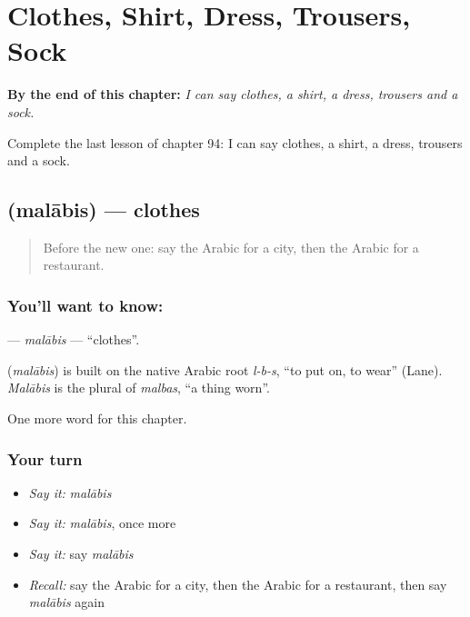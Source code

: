 
\chapter{Clothes, Shirt, Dress, Trousers, Sock}
\label{ch:ar-clothes-shirt-dress-trousers-sock}

\begin{chapteropening}
\textbf{By the end of this chapter:} \emph{I can say clothes, a shirt, a dress, trousers and a sock.}

Complete the last lesson of chapter 94: I can say clothes, a shirt, a dress, trousers and a sock.
\end{chapteropening}

\section[\texorpdfstring{\ar{ملابس} (malābis)}{ملابس (malābis)}]{ (malābis) — clothes}

\label{lesson:AR-C94-malabis}



\begin{quote}
Before the new one: say the Arabic for a city, then the Arabic for a restaurant.
\end{quote}

\subsection*{You'll want to know: }
\textbf{} — \emph{malābis} — \textquotedblleft{}clothes\textquotedblright{}.

\begin{cousinweb}
\textbf{} (\emph{malābis}) is built on the native Arabic root \emph{l-b-s}, \textquotedblleft{}to put on, to wear\textquotedblright{} (Lane). \emph{Malābis} is the plural of \emph{malbas}, \textquotedblleft{}a thing worn\textquotedblright{}.
\end{cousinweb}

\begin{grammarlens}[title={What you've built}]
One more word for this chapter.
\end{grammarlens}

\subsection*{Your turn}
\begin{itemize}
\raggedright
  \item \emph{Say it:} \emph{malābis}
  \item \emph{Say it:} \emph{malābis}, once more
  \item \emph{Say it:} say \emph{malābis}
  \item \emph{Recall:} say the Arabic for a city, then the Arabic for a restaurant, then say \emph{malābis} again
\end{itemize}

